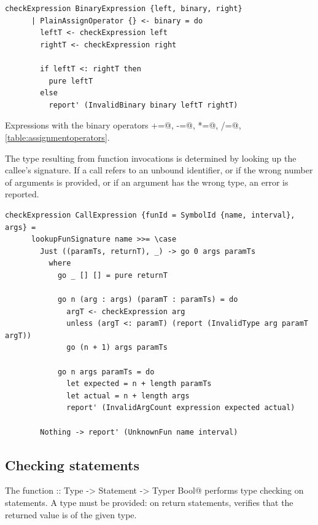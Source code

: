 \documentclass[UdineBachThesis,american,11pt,draft]{PhdThesis}
\begin{document}
  \begin{lstlisting}[gobble=4,basicstyle=\ttfamily\small]
    checkExpression BinaryExpression {left, binary, right}
      | PlainAssignOperator {} <- binary = do
        leftT <- checkExpression left
        rightT <- checkExpression right

        if leftT <: rightT then
          pure leftT
        else
          report' (InvalidBinary binary leftT rightT)
  \end{lstlisting}

  Expressions with the binary operators \lstinline@+=@, \lstinline@-=@,
  \lstinline@*=@, \lstinline@/=@,
  \lstinline@%=@ are type checked considering the shorthands detailed in table
  \ref{table:assignmentoperators}.

  The type resulting from function invocations is determined by looking up the
  callee's signature. If a call refers to an unbound identifier, or if the wrong
  number of arguments is provided, or if an argument has the wrong type, an
  error is reported.

  \begin{lstlisting}[gobble=4,basicstyle=\ttfamily\small]
    checkExpression CallExpression {funId = SymbolId {name, interval}, args} =
      lookupFunSignature name >>= \case
        Just ((paramTs, returnT), _) -> go 0 args paramTs
          where
            go _ [] [] = pure returnT

            go n (arg : args) (paramT : paramTs) = do
              argT <- checkExpression arg
              unless (argT <: paramT) (report (InvalidType arg paramT argT))
              go (n + 1) args paramTs

            go n args paramTs = do
              let expected = n + length paramTs
              let actual = n + length args
              report' (InvalidArgCount expression expected actual)

        Nothing -> report' (UnknownFun name interval)
  \end{lstlisting}

  \subsection{Checking statements}

  The function \lstinline@checkStatement :: Type -> Statement -> Typer Bool@
  performs type \linebreak checking on statements. A type must be provided: on
  return statements, \lstinline@checkStatement@ verifies that the returned value
  is of the given type.
\end{document}
